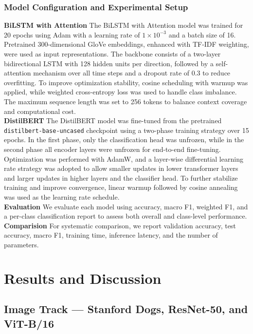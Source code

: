 \documentclass[twoside,final]{hcmut-report}
\begin{document}
\subsubsection{Model Configuration and Experimental Setup} 
\noindent \textbf{BiLSTM with Attention} The BiLSTM with Attention model was trained for 20 epochs using Adam with a learning rate of $1\times10^{-3}$ and a batch size of 16. Pretrained 300-dimensional GloVe embeddings, enhanced with TF-IDF weighting, were used as input representations. The backbone consists of a two-layer bidirectional LSTM with 128 hidden units per direction, followed by a self-attention mechanism over all time steps and a dropout rate of 0.3 to reduce overfitting. To improve optimization stability, cosine scheduling with warmup was applied, while weighted cross-entropy loss was used to handle class imbalance. The maximum sequence length was set to 256 tokens to balance context coverage and computational cost. \\
\noindent \textbf{DistilBERT} The DistilBERT model was fine-tuned from the pretrained \\\texttt{distilbert-base-uncased} checkpoint using a two-phase training strategy over 15 epochs. In the first phase, only the classification head was unfrozen, while in the second phase all encoder layers were unfrozen for end-to-end fine-tuning. Optimization was performed with AdamW, and a layer-wise differential learning rate strategy was adopted to allow smaller updates in lower transformer layers and larger updates in higher layers and the classifier head. To further stabilize training and improve convergence, linear warmup followed by cosine annealing was used as the learning rate schedule. \\ 

\noindent \textbf{Evaluation} We evaluate each model using accuracy, macro F1, weighted F1, and a per-class classification report to assess both overall and class-level performance. \\ 

\noindent \textbf{Comparision} For systematic comparison, we report validation accuracy, test accuracy, macro F1, training time, inference latency, and the number of parameters.

\section{Results and Discussion}

\subsection{Image Track --- Stanford Dogs, ResNet-50, and ViT-B/16}
\end{document}

